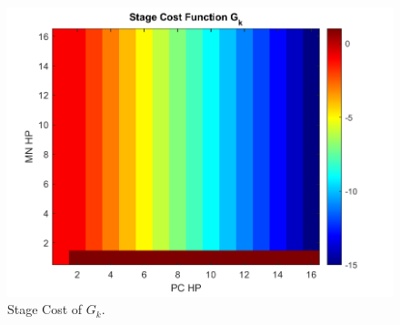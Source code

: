 \documentclass[letterpaper, 10 pt, conference]{ieeeconf}
\begin{document}
\begin{figure}[thb]
    \centering
    \includegraphics[scale =0.44]{figs/DND_StageCost_G_k.png}
    \caption{Stage Cost of $G_k$.}
    \label{fig:G_k_vis}
\end{figure}



{}

\end{document}
